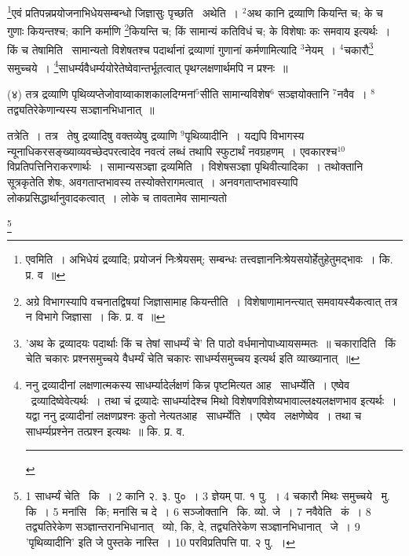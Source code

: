 \documentclass[11pt, openany]{book}
\newcommand\blfootnote[1]{%
 \begingroup
 \renewcommand\thefootnote{}\footnote{#1}%
 \addtocounter{footnote}{-1}%
 \endgroup
}
\begin{document}
\renewcommand{\thefootnote}{१}\footnote{एवमिति~। अभिधेयं द्रव्यादि; प्रयोजनं निःश्रेयसम्; सम्बन्धः तत्त्वज्ञाननिःश्रेयसयोर्हेतुहेतुमद्भावः~। कि. प्र. व~॥}एवं प्रतिपन्नप्रयोजनाभिधेयसम्बन्धो जिज्ञासुः पृच्छति \textendash\ अथेति~। ${}^2$अथ कानि द्रव्याणि कियन्ति च; के च गुणाः कियन्तश्च; कानि कर्माणि \renewcommand{\thefootnote}{२}\footnote{अग्रे विभागस्यापि वचनातद्विषयां जिज्ञासामाह कियन्तीति~। विशेषाणामानन्त्यात् समवायस्यैकत्वात् तत्र न विभागे जिज्ञासा~। कि. प्र. व~॥}कियन्ति च; किं सामान्यं कतिविधं च; के विशेषाः कः समवाय इत्यर्थः~। किं च तेषामिति \textendash\ सामान्यतो विशेषतश्च पदार्थानां द्रव्याणां गुणानां कर्मणामित्यादि ${}^3$नेयम्~। ${}^4$चकारौ\renewcommand{\thefootnote}{३}\footnote{'अथ के द्रव्यादयः पदार्थाः किं च तेषां साधर्म्यं चे' ति पाठो वर्धमानोपाध्यायसम्मतः~॥ चकारादिति \textendash\ किं चेति चकारः प्रश्नसमुच्चये वैधर्म्यं चेति चकारः साधर्म्यसमुच्चय इत्यर्थ इति व्याख्यानात्~॥} समुच्चये~। \renewcommand{\thefootnote}{४}\footnote{ननु द्रव्यादीनां लक्षणात्मकस्य साधर्म्यादेर्लक्षणं किन्न पृष्टमित्यत आह \textendash\ साधर्म्येति~। एष्वेव \textendash\ द्रव्यादिष्वेवेत्यर्थः~। तथा चं द्रव्यादेः साधर्म्यादेश्च मिथो विशेषणविशेष्यभावाल्लक्ष्यलक्षणभाव इत्यर्थः~। यद्वा ननु द्रव्यादीनां लक्षणप्रश्नः कुतो नेत्यतआह \textendash\ साधर्म्येति~। एष्वेव \textendash\ लक्षणेष्वेव~। तथा च साधर्म्यप्रश्नेन तत्प्रश्न इत्यथः~॥ कि. प्र. व.\\ \rule{0.4\linewidth}{0.5pt}}साधर्म्यवैधर्म्ययोरेतेष्वेवान्तर्भूतत्वात् पृथग्लक्षणार्थमपि न प्रश्नः~॥

\hangindent=2cm {\knu (४) तत्र द्रव्याणि पृथिव्यप्तेजोवाय्वाकाशकालदिग्मनां$^5$सीति सामान्यविशेष$^6$ सञ्ज्ञयोक्तानि ${}^7$नवैव~। ${}^8$तद्व्यतिरेकेणान्यस्य सञ्ज्ञानभिधानात्~॥}

तत्रेति~। तत्र \textendash\ तेषु द्रव्यादिषु वक्तव्येषु द्रव्याणि ${}^9$पृथिव्यादीनि~। यद्यपि विभागस्य न्यूनाधिकरसङ्ख्याव्यवच्छेदपरत्वादेव नवत्वं लब्धं तथापि स्फुटार्थं नवग्रहणम्~। एवकारश्च${}^10$विप्रतिपत्तिनिराकरणार्थः~। सामान्यसञ्ज्ञा द्रव्यमिति~। विशेषसञ्ज्ञा पृथिवीत्यादिका~। तथोक्तानि सूत्रकृतेति शेषः, अवगताप्तभावस्य तस्योक्तेरागमत्वात्~। अनवगताप्तभावस्यापि लोकप्रसिद्धार्थानुवादकत्वात्~। लोके च तावतामेव सामान्यतो

\blfootnote{1 साधर्म्यं चेति  \textendash\ कि~। 2 कानि २. ३. पु०~। 3 ज्ञेयम् पा. १ पु.~। 4 चकारौ मिथः समुच्चये  \textendash\ मु. कि~। 5 मनांसि \textendash\ कि; मनांसि च दे~। 6 सञ्जोक्तानि \textendash\ कि. व्यो. जे~। 7 नवैवेति \textendash\ कं~। 8 तद्व्यतिरेकेण सञ्ज्ञान्तरानभिधानात् \textendash\ व्यो, कि, दे, तद्व्यतिरेकेण सञ्ज्ञानभिधानात् \textendash\ जे~। 9 'पृथिव्यादीनि' इति जे पुस्तके नास्ति~। 10 परविप्रतिपत्ति पा. २ पु.~।}
\end{document}
